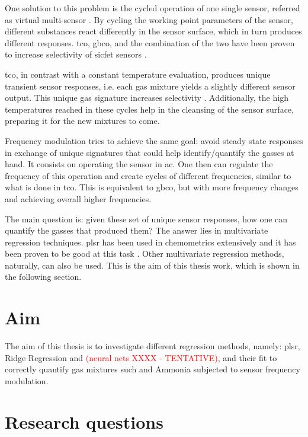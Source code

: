 {One solution to this problem is the cycled operation of one single sensor, referred as virtual multi-sensor \cite{Bastuck_2019}. By cycling the working point parameters of the sensor, different substances react differently in the sensor surface, which in turn produces different responses. \acrfull{tco}, \acrfull{gbco}, and the combination of the two have been proven to increase selectivity of \acrshort{sicfet} sensors \cite{Bastuck_2019}.

\acrshort{tco}, in contrast with a constant temperature evaluation, produces unique transient sensor responses, i.e. each gas mixture yields a slightly different sensor output. This unique gas signature increases selectivity \cite{bur2014}. Additionally, the high temperatures reached in these cycles help in the cleansing of the sensor surface, preparing it for the new mixtures to come.

Frequency modulation tries to achieve the same goal: avoid steady state responses in exchange of unique signatures that could help identify/quantify the gasses at hand. It consists on operating the sensor in \acrfull{ac}. One then can regulate the frequency of this operation and create cycles of different frequencies, similar to what is done in \acrshort{tco}. This is equivalent to \acrshort{gbco}, but with more frequency changes and achieving overall higher frequencies.

The main question is: given these set of unique sensor responses, how one can quantify the gasses that produced them? The answer lies in multivariate regression techniques. \acrfull{plsr} has been used in chemometrics extensively and it has been proven to be good at this task \cite{Bastuck_2019} \cite{wold2011}. Other multivariate regression methods, naturally, can also be used. This is the aim of this thesis work, which is shown in the following section.

\section{Aim}
\label{sec:aim}

The aim of this thesis is to investigate different regression methods, namely: \acrshort{plsr}, Ridge Regression and \textcolor{red}{(neural nets XXXX - TENTATIVE)}, and their fit to correctly quantify gas mixtures such \nox and Ammonia subjected to sensor frequency modulation.

\section{Research questions}
\label{sec:research-questions}

}
